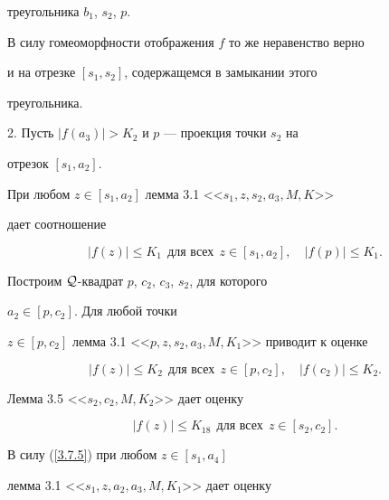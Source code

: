 \begin{pf}
треугольника $b_1$, $s_2$, $p$.


В силу гомеоморфности отображения $f$ то же неравенство верно 


и на отрезке $[s_1, s_2]$, содержащемся в замыкании этого 


треугольника.


\smallskip





2. Пусть $|f(a_3)| > K_2$ и $p$ --- проекция точки $s_2$ на 


отрезок $[s_1, a_2]$.


При любом $z\in [s_1, a_2]$ лемма 3.1 <<$s_1, z, s_2, a_3, M, K$>> 


дает соотношение


\begin{equation}


\label{3.7.5}


|f(z)|\leq K_1 \ \ \text{для всех} \ \ z\in [s_1, a_2],\quad


|f(p)|\leq K_1. 


\end{equation} 


Построим ${\cal Q}$-квадрат $p$, $c_2$, $c_3$, $s_2$, для которого 


$a_2 \in [p, c_2]$. Для любой точки 


$z\in [p, c_2]$ лемма 3.1 <<$p, z, s_2, a_3, M, K_1$>> приводит к оценке 


\begin{equation}


\label{3.7.6}


|f(z)|\leq K_2 \ \ \text{для всех} \ \ z\in [p, c_2], 


\quad |f(c_2)|\leq K_2.


\end{equation}


Лемма 3.5 <<$s_2, c_2, M, K_2$>> дает оценку 


\begin{equation} 


\label{3.7.7}


|f(z)|\leq K_{18} \ \ \text{для всех} \ \ z\in [s_2, c_2].


\end{equation}


В силу (\ref{3.7.5}) при любом $z\in [s_1, a_4]$ 


лемма 3.1 <<$s_1, z, a_2, a_3, M, K_1$>> дает оценку


\begin{equation}



\end{equation}
\end{pf}
